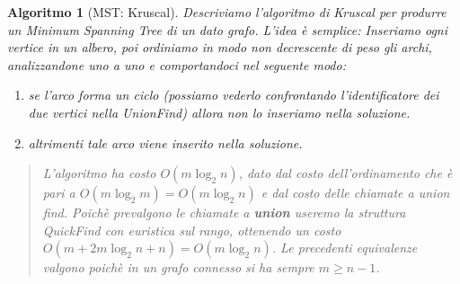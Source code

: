 \documentclass[oneside]{book}
\newtheorem{alg}{Algoritmo}
\begin{document}
\begin{alg}[MST: Kruscal]
  Descriviamo l'algoritmo di Kruscal per produrre un Minimum Spanning Tree di
  un dato grafo. L'idea \`e semplice: Inseriamo ogni vertice in un albero, poi
  ordiniamo in modo non decrescente di peso gli archi, analizzandone uno a uno
  e comportandoci nel seguente modo:
  \begin{enumerate}
    \item se l'arco forma un ciclo (possiamo vederlo confrontando l'identificatore
      dei due vertici nella UnionFind) allora non lo inseriamo nella soluzione.
    \item altrimenti tale arco viene inserito nella soluzione.
  \end{enumerate}

  \begin{algorithm}[H]
  \end{algorithm}
  \begin{quote}
    L'algoritmo ha costo $O(m \log_2 n)$, dato dal costo dell'ordinamento che
    \`e pari a $O(m \log_2 m) = O(m \log_2 n)$ e dal costo delle chiamate a union find.
    Poich\`e prevalgono le chiamate a \textbf{union} useremo la struttura QuickFind
    con euristica sul rango, ottenendo un costo $O(m + 2m \log_2 n + n) = O(m \log_2 n)$.
    Le precedenti equivalenze valgono poich\`e in un grafo connesso si ha sempre
    $m \geq n-1$.
  \end{quote}
\end{alg}
\end{document}

